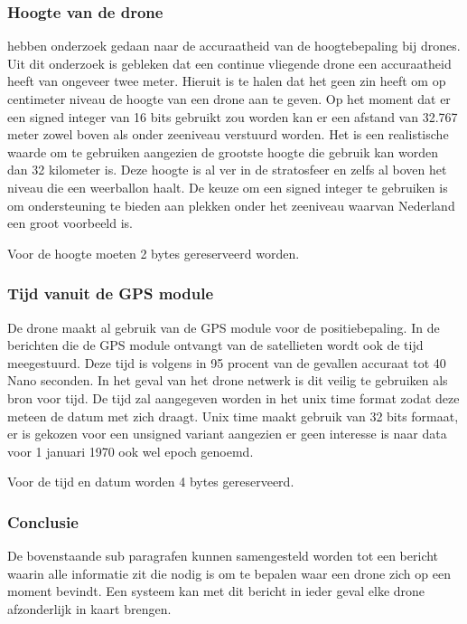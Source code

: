 \documentclass[a4paper, 11pt, oneside]{report}
\begin{document}
\subsubsection*{Hoogte van de drone}
 hebben onderzoek gedaan naar de accuraatheid van de hoogtebepaling bij drones. 
Uit dit onderzoek is gebleken dat een continue vliegende drone een accuraatheid heeft van ongeveer twee meter.
Hieruit is te halen dat het geen zin heeft om op centimeter niveau de hoogte van een drone aan te geven.
Op het moment dat er een signed integer van 16 bits gebruikt zou worden kan er een afstand van 32.767 meter zowel boven als onder zeeniveau verstuurd worden.
Het is een realistische waarde om te gebruiken aangezien de grootste hoogte die gebruik kan worden dan 32 kilometer is.
Deze hoogte is al ver in de stratosfeer en zelfs al boven het niveau die een weerballon haalt. 
De keuze om een signed integer te gebruiken is om ondersteuning te bieden aan plekken onder het zeeniveau waarvan Nederland een groot voorbeeld is.

Voor de hoogte moeten 2 bytes gereserveerd worden. 

\subsubsection*{Tijd vanuit de GPS module}

De drone maakt al gebruik van de GPS module voor de positiebepaling.
In de berichten die de GPS module ontvangt van de satellieten wordt ook de tijd meegestuurd.
Deze tijd is volgens \cite{GPSaccu} in 95 procent van de gevallen accuraat tot 40 Nano seconden. 
In het geval van het drone netwerk is dit veilig te gebruiken als bron voor tijd.
De tijd zal aangegeven worden in het unix time format zodat deze meteen de datum met zich draagt.
Unix time maakt gebruik van 32 bits formaat, er is gekozen voor een unsigned variant aangezien er geen interesse is naar data voor 1 januari 1970 ook wel epoch genoemd.

Voor de tijd en datum worden 4 bytes gereserveerd.

\subsubsection*{Conclusie}  

De bovenstaande sub paragrafen kunnen samengesteld worden tot een bericht waarin alle informatie zit die nodig is om te bepalen waar een drone zich op een moment bevindt.
Een systeem kan met dit bericht in ieder geval elke drone afzonderlijk in kaart brengen.
\end{document}
